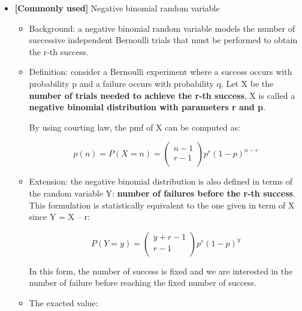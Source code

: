\documentclass[12pt]{report}
\renewcommand{\_}{\kern-1.5pt\textunderscore\kern-1.5pt}
\begin{document}
\begin{itemize}
	\item \textbf{[Commonly used]} Negative binomial random variable\par

\begin{itemize}
	\item Background: a negative binomial random variable models the number of successive independent Bernoulli trials that must be performed to obtain the r-th success. \par

	\item Definition: consider a Bernoulli experiment where a success occurs with probability p and a failure occurs with probability q. Let X be the\textbf{ number of trials needed to achieve the r-th success}, X is called a \textbf{negative binomial distribution with parameters r and p}. \par

By using courting law, the pmf of X can be computed as:\par

 \[ p \left( n \right) =P \left( X=n \right) = \left( \begin{matrix}
n-1\\
r-1\\
\end{matrix}
 \right) p^{r} \left( 1-p \right) ^{n-r} \] \par

	\item Extension: the negative binomial distribution is also defined in terms of the random variable Y: \textbf{number of failures before the r-th success}. This formulation is statistically equivalent to the one given in term of X since Y = X – r:\par

 \[ P \left( Y=y \right) = \left( \begin{matrix}
y+r-1\\
r-1\\
\end{matrix}
 \right) p^{r} \left( 1-p \right) ^{y} \] \par

In this form, the number of success is fixed and we are interested in the number of failure before reaching the fixed number of success.\par

	\item The exacted value:\par


\end{itemize}
\end{itemize}
\end{document}
